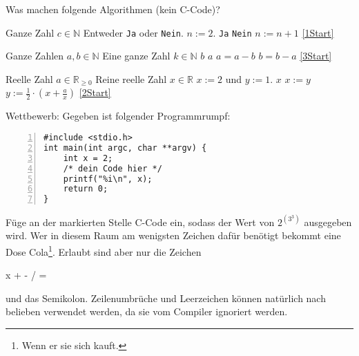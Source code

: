 \documentclass{uebungszettel}
\begin{document}
\begin{aufg}
Was machen folgende Algorithmen (kein C-Code)?

\begin{algorithm}[H]
\caption{}
\begin{algorithmic}[1]
\REQUIRE Ganze Zahl $c\in\mathbb{N}$
\ENSURE Entweder \verb|Ja| oder \verb|Nein|.
\STATE \SET $n := 2$.
 \label{1Start}
\RETURN \verb|Ja|
\ENDIF
{}
\RETURN \verb|Nein|
\ENDIF
\STATE \SET $n := n + 1$
\STATE \GOTO \ref{1Start}
\end{algorithmic}
\end{algorithm}

\begin{algorithm}[H]
\caption{}
\begin{algorithmic}[1]
\REQUIRE Ganze Zahlen $a,b\in\mathbb{N}$
\ENSURE Eine ganze Zahl $k\in\mathbb{N}$
\RETURN $b$
\ENDIF
{} \label{3Start}
\RETURN $a$
\ENDIF
{}
\STATE \SET $a = a - b$
\ELSE 
\STATE \SET $b = b - a$
\ENDIF
\STATE \GOTO \ref{3Start}
\end{algorithmic}
\end{algorithm}

\begin{algorithm}[H]
\caption{}
\begin{algorithmic}[1]
\REQUIRE Reelle Zahl $a\in\mathbb{R}_{\ge 0}$
\ENSURE Reine reelle Zahl $x\in\mathbb{R}$
\STATE \SET $x := 2$ und $y := 1$.
 \label{2Start} 
\RETURN $x$
\ENDIF
\STATE \SET $x := y$
\STATE \SET $y := \frac{1}{2} \cdot \left(x+\frac{a}{x}\right)$
\STATE \GOTO \ref{2Start}
\end{algorithmic}
\end{algorithm}
\end{aufg}

\begin{aufg}
Wettbewerb: Gegeben ist folgender Programmrumpf:
\begin{codelisting}
\begin{lstlisting}[numbers=left,numberstyle=\tiny,frame=tlrb]
#include <stdio.h>
int main(int argc, char **argv) {
	int x = 2;
	/* dein Code hier */
	printf("%i\n", x);
	return 0;
}
\end{lstlisting}
\end{codelisting}
Füge an der markierten Stelle C-Code ein, sodass der Wert von $2^{\left(3^3\right)}$ ausgegeben wird. Wer in diesem Raum am wenigsten Zeichen dafür benötigt bekommt eine Dose Cola\footnote{Wenn er sie sich kauft.}. Erlaubt sind aber nur die Zeichen 
\begin{center}
	x \quad + \quad - \quad * \quad / \quad =
\end{center}
und das Semikolon. Zeilenumbrüche und Leerzeichen können natürlich nach belieben verwendet werden, da sie vom Compiler ignoriert werden.
\end{aufg}
\end{document}
